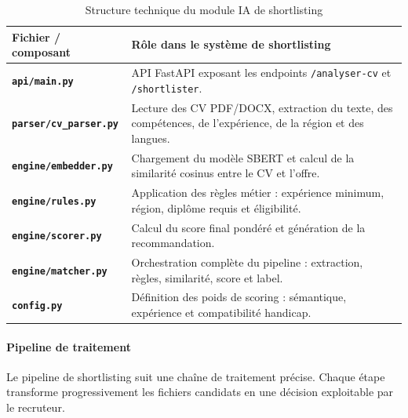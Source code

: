 \documentclass[12pt,a4paper]{report}
\newcommand{\tblhead}[1]{\cellcolor{darkblue}\color{white}\bfseries #1}
\newcommand{\tblleft}[1]{\bfseries\color{darkblue} #1}
\begin{document}
\renewcommand{\arraystretch}{1.25}
\begin{table}[H]
\centering
\begin{tabularx}{\textwidth}{|L{4.1cm}|Y|}
\hline
\tblhead{Fichier / composant} & \tblhead{Rôle dans le système de shortlisting} \\
\hline
\tblleft{\texttt{api/main.py}} & API FastAPI exposant les endpoints \texttt{/analyser-cv} et \texttt{/shortlister}. \\
\hline
\tblleft{\texttt{parser/cv\_parser.py}} & Lecture des CV PDF/DOCX, extraction du texte, des compétences, de l'expérience, de la région et des langues. \\
\hline
\tblleft{\texttt{engine/embedder.py}} & Chargement du modèle SBERT et calcul de la similarité cosinus entre le CV et l'offre. \\
\hline
\tblleft{\texttt{engine/rules.py}} & Application des règles métier : expérience minimum, région, diplôme requis et éligibilité. \\
\hline
\tblleft{\texttt{engine/scorer.py}} & Calcul du score final pondéré et génération de la recommandation. \\
\hline
\tblleft{\texttt{engine/matcher.py}} & Orchestration complète du pipeline : extraction, règles, similarité, score et label. \\
\hline
\tblleft{\texttt{config.py}} & Définition des poids de scoring : sémantique, expérience et compatibilité handicap. \\
\hline
\end{tabularx}
\caption{Structure technique du module IA de shortlisting}
\label{tab:structure-shortlisting}
\end{table}
\renewcommand{\arraystretch}{1}

\paragraph{Pipeline de traitement}

Le pipeline de shortlisting suit une chaîne de traitement précise. Chaque étape transforme progressivement les fichiers candidats en une décision exploitable par le recruteur.
\end{document}
